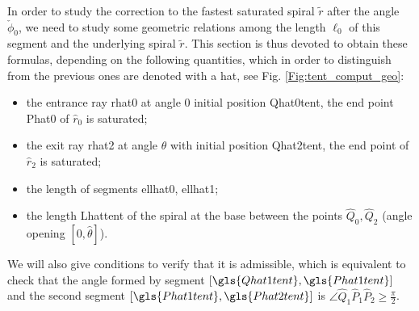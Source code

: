 \documentclass[reqno]{amsart}
\theoremstyle{definition} \newtheorem{definition}{Definition}[section]
\theoremstyle{definition} \newtheorem{remark}[definition]{Remark}
\theoremstyle{plain} \newtheorem{lemma}[definition]{Lemma}
\theoremstyle{plain} \newtheorem{proposition}[definition]{Proposition}
\theoremstyle{plain} \newtheorem{theorem}[definition]{Theorem}
\theoremstyle{plain} \newtheorem{corollary}[definition]{Corollary}
\theoremstyle{definition} \newtheorem{example}[definition]{Example}
\theoremstyle{plain} \newtheorem{claim}[clai]{Claim}
\theoremstyle{definition} \newtheorem{assumption}[definition]{Assumption}
\theoremstyle{definition} \newtheorem{observation}[definition]{Observation}
\newcommand{\1}{\mathbbm 1}
\numberwithin{equation}{section} %
\theoremstyle{plain} \newtheorem*{theorem*}{Theorem}
\theoremstyle{plain} \newtheorem{mthm}[maintheorem]{Main Theorem}
\theoremstyle{plain} \newtheorem*{mthm*}{Main Theorem}
\theoremstyle{plain} \newtheorem*{conjecture*}{Conjecture}
\theoremstyle{plain} \newtheorem{conjecture}[definition]{Conjecture}
\theoremstyle{plain} \newtheorem*{problem*}{Problem}
\begin{document}
In order to study the correction to the fastest saturated spiral $\tilde r$ after the angle $\check \phi_0$, we need to study some geometric relations among the length $\ell_0$ of this segment and the underlying spiral $\tilde r$. This section is thus devoted to obtain these formulas, depending on the following quantities, which in order to distinguish from the previous ones are denoted with a hat, see Fig. \ref{Fig:tent_comput_geo}:
\begin{itemize}
\item the entrance ray  \gls{rhat0} at angle $0$ initial position  \gls{Qhat0tent}, the end point  \gls{Phat0} of $\hat r_0$ is saturated;
\item the exit ray  \gls{rhat2} at angle $\hat \theta$ with initial position  \gls{Qhat2tent}, the end point of $\hat r_2$ is saturated;
\item the length of segments   \gls{ellhat0}, \gls{ellhat1};
\item the length  \gls{Lhattent} of the spiral at the base between the points $\hat Q_0, \hat Q_2$ (angle opening $[0,\hat \theta]$).
\end{itemize}
We will also give conditions to verify that it is admissible, which is equivalent to check that the angle formed by segment   $[\gls{Qhat1tent},\gls{Phat1tent}]$ and  the second segment $[\gls{Phat1tent},\gls{Phat2tent}]$ is $\angle \hat Q_1\hat P_1\hat P_2\geq\frac{\pi}{2}$.
\end{document}
